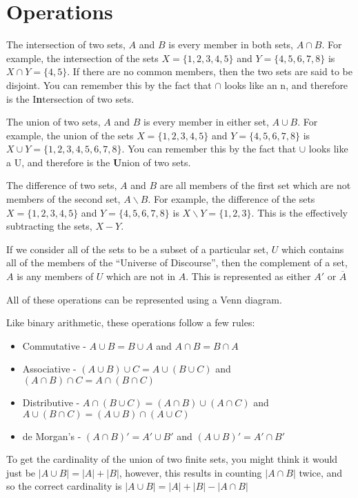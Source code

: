 \section*{Operations}

The intersection of two sets, $A$ and $B$ is every member in both sets, $A \cap B$. For example, the intersection of the
 sets $X = \{1, 2, 3, 4, 5\}$ and $Y = \{4, 5, 6, 7, 8\}$ is $X \cap Y = \{4, 5\}$. If there are no common members, then
 the two sets are said to be disjoint. You can remember this by the fact that $\cap$ looks like an n, and therefore is
 the I\textbf{n}tersection of two sets.

The union of two sets, $A$ and $B$ is every member in either set, $A \cup B$. For example, the union of the sets
 $X = \{1, 2, 3, 4, 5\}$ and $Y = \{4, 5, 6, 7, 8\}$ is $X \cup Y = \{1, 2, 3, 4, 5, 6, 7, 8\}$. You can remember this
 by the fact that $\cup$ looks like a U, and therefore is the \textbf{U}nion of two sets.

The difference of two sets, $A$ and $B$ are all members of the first set which are not members of the second set,
 $A \backslash B$. For example, the difference of the sets $X = \{1, 2, 3, 4, 5\}$ and $Y = \{4, 5, 6, 7, 8\}$ is
 $X \backslash Y = \{1, 2, 3\}$. This is the effectively subtracting the sets, $X - Y$.

If we consider all of the sets to be a subset of a particular set, $U$ which contains all of the members of the
 ``Universe of Discourse'', then the complement of a set, $A$ is any members of $U$ which are not in $A$. This is
  represented as either $A'$ or $\overline{A}$

All of these operations can be represented using a Venn diagram.

Like binary arithmetic, these operations follow a few rules:
\begin{itemize}
  \item Commutative - $A \cup B = B \cup A$ and $A \cap B = B \cap A$
  \item Associative - $(A \cup B) \cup C = A \cup (B \cup C)$ and $(A \cap B) \cap C = A \cap (B \cap C)$
  \item Distributive - $A \cap (B \cup C) = (A \cap B) \cup (A \cap C)$ and
   $A \cup (B \cap C) = (A \cup B) \cap (A \cup C)$
  \item de Morgan's - $(A \cap B)' = A' \cup B'$ and $(A \cup B)' = A' \cap B'$
\end{itemize}

To get the cardinality of the union of two finite sets, you might think it would just be
 $\lvert A \cup B \rvert = \lvert A \rvert + \lvert B \rvert$, however, this results in counting $\lvert A \cap B \rvert$
 twice, and so the correct cardinality is $\lvert A \cup B \rvert = \lvert A \rvert + \lvert B \rvert - \lvert A \cap B \rvert$

